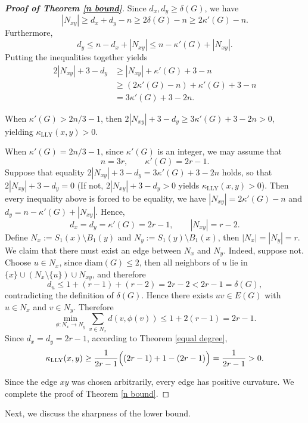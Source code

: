 \documentclass[10pt,a4paper]{article}
\theoremstyle{definition}
\theoremstyle{definition}
\theoremstyle{nonumber}
\newtheorem*{theorem*}{Theorem}
\begin{document}
\begin{proof}[\bf{Proof of Theorem \ref{n bound}}]
Since $d_x,d_y\ge \delta(G)$, we have 
$$
|N_{xy}|\geq d_x+d_y-n\geq 2\delta(G)-n\ge 2\kappa'(G)-n.
$$
Furthermore, 
$$
d_y\leq n-d_x+|N_{xy}|\le n-\kappa'(G)+|N_{xy}|.
$$
Putting the inequalities together yields
\begin{align*}
2|N_{xy}|+3-d_y&\geq |N_{xy}|+\kappa'(G)+3-n\\
&\geq(2\kappa'(G)-n)+\kappa'(G)+3-n\\
&=3\kappa'(G)+3-2n.
\end{align*}

When $\kappa'(G)>2n/3-1$, then $2|N_{xy}|+3-d_y\geq3\kappa'(G)+3-2n>0$, yielding $\kappa_{\mathrm{LLY}}(x,y)>0$.

When $\kappa'(G)=2n/3-1$, since $\kappa'(G)$ is an integer, we may assume that 
$$
n=3r,\qquad\kappa'(G)=2r-1.
$$
Suppose that equality $2|N_{xy}|+3-d_y=3\kappa'(G)+3-2n$ holds, so that $2|N_{xy}|+3-d_y=0$ (If not, $2|N_{xy}|+3-d_y>0$ yields $\kappa_{\mathrm{LLY}}(x,y)>0$).
Then every inequality above is forced to be equality, we have $|N_{xy}|=2\kappa'(G)-n$ and $d_y=n-\kappa'(G)+|N_{xy}|.$ Hence, 
$$
d_x=d_y=\kappa'(G)=2r-1,\qquad|N_{xy}|=r-2.
$$
Define $N_x:=S_1(x)\setminus B_1(y)$ and $N_y:=S_1(y)\setminus B_1(x)$,
then $|N_x|=|N_y|=r$.
We claim that there must exist an edge between $N_x$ and $N_y$.
Indeed, suppose not. Choose $u\in N_x$, since $\mathrm{diam}(G) \leq 2$, then all neighbors of $u$ lie in $\{x\}\cup(N_x\setminus\{u\})\cup N_{xy}$, and therefore
$$
d_u\leq1+(r-1)+(r-2)=2r-2<2r-1=\delta(G),
$$
contradicting the definition of $\delta(G)$.
Hence there exists $uv\in E(G)$ with $u\in N_x$ and $v\in N_y$.
Therefore
$$\min_{\phi: N_x \to N_y} \sum_{v \in N_x} d(v, \phi(v))\leq1+2(r-1)=2r-1.$$
Since $d_x=d_y=2r-1$, according to Theorem \ref{equal degree}, 
$$\kappa_{\mathrm{LLY}}(x,y)\ge\frac1{2r-1}\Bigl((2r-1)+1-(2r-1)\Bigr)=\frac1{2r-1}>0.$$

Since the edge $xy$ was chosen arbitrarily, every edge has positive curvature. We complete the proof of Theorem \ref{n bound}.
\end{proof}

Next, we discuss the sharpness of the lower bound.

\end{document}
